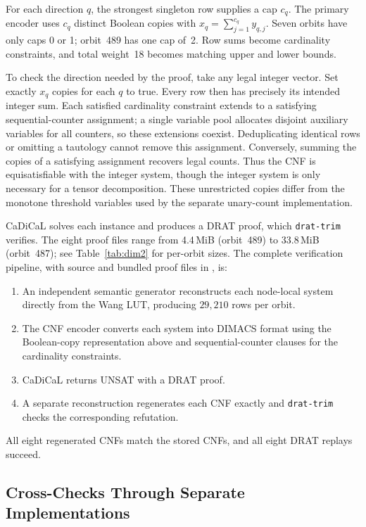\documentclass[11pt,a4paper]{article}
\begin{document}
For each direction $q$, the strongest singleton row supplies a cap $c_q$. The primary encoder uses $c_q$ distinct Boolean copies with $x_q=\sum_{j=1}^{c_q}y_{q,j}$. Seven orbits have only caps 0 or 1; orbit~489 has one cap of~2. Row sums become cardinality constraints, and total weight~18 becomes matching upper and lower bounds.

To check the direction needed by the proof, take any legal integer vector. Set exactly $x_q$ copies for each $q$ to true. Every row then has precisely its intended integer sum. Each satisfied cardinality constraint extends to a satisfying sequential-counter assignment; a single variable pool allocates disjoint auxiliary variables for all counters, so these extensions coexist. Deduplicating identical rows or omitting a tautology cannot remove this assignment. Conversely, summing the copies of a satisfying assignment recovers legal counts. Thus the CNF is equisatisfiable with the integer system, though the integer system is only necessary for a tensor decomposition. These unrestricted copies differ from the monotone threshold variables used by the separate unary-count implementation.

CaDiCaL solves each instance and produces a DRAT proof, which \texttt{drat-trim} verifies.  The eight proof files range from 4.4\,MiB (orbit~489) to 33.8\,MiB (orbit~487); see Table~\ref{tab:dim2} for per-orbit sizes.  The complete verification pipeline, with source and bundled proof files in , is:
\begin{enumerate}
  \item An independent semantic generator reconstructs each node-local system directly from the Wang LUT, producing $29{,}210$ rows per orbit.
  \item The CNF encoder converts each system into DIMACS format using the Boolean-copy representation above and sequential-counter clauses for the cardinality constraints.
  \item CaDiCaL returns UNSAT with a DRAT proof.
  \item A separate reconstruction regenerates each CNF exactly and
  \texttt{drat-trim} checks the corresponding refutation.
\end{enumerate}
All eight regenerated CNFs match the stored CNFs, and all eight DRAT replays succeed.

\subsection{Cross-Checks Through Separate Implementations}
\end{document}
